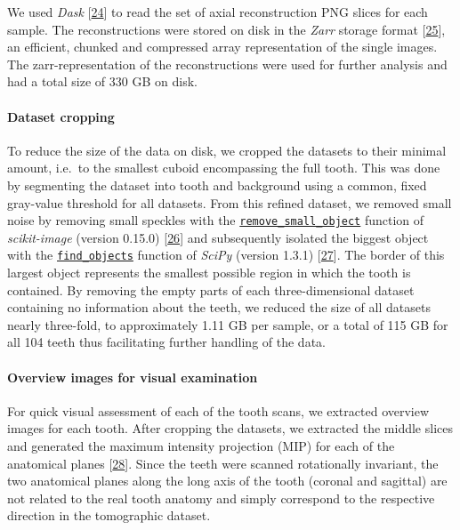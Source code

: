 \documentclass[
  american,
]{article}
\begin{document}
We used \emph{Dask} {[}\protect\hyperlink{ref-hj1CnyWB}{24}{]} to read the set of axial reconstruction PNG slices for each sample.
The reconstructions were stored on disk in the \emph{Zarr} storage format {[}\protect\hyperlink{ref-10Fk3ASPz}{25}{]}, an efficient, chunked and compressed array representation of the single images.
The zarr-representation of the reconstructions were used for further analysis and had a total size of 330 GB on disk.

\hypertarget{dataset-cropping}{%
\paragraph{Dataset cropping}\label{dataset-cropping}}

To reduce the size of the data on disk, we cropped the datasets to their minimal amount, i.e.~to the smallest cuboid encompassing the full tooth.
This was done by segmenting the dataset into tooth and background using a common, fixed gray-value threshold for all datasets.
From this refined dataset, we removed small noise by removing small speckles with the \href{https://scikit-image.org/docs/dev/api/skimage.morphology.html\#skimage.morphology.remove_small_objects}{\texttt{remove\_small\_object}} function of \emph{scikit-image} (version 0.15.0) {[}\protect\hyperlink{ref-stvWEJeu}{26}{]} and subsequently isolated the biggest object with the \href{https://docs.scipy.org/doc/scipy/reference/generated/scipy.ndimage.find_objects.html}{\texttt{find\_objects}} function of \emph{SciPy} (version 1.3.1) {[}\protect\hyperlink{ref-8Miti2Gz}{27}{]}.
The border of this largest object represents the smallest possible region in which the tooth is contained.
By removing the empty parts of each three-dimensional dataset containing no information about the teeth, we reduced the size of all datasets nearly three-fold, to approximately 1.11 GB per sample, or a total of 115 GB for all 104 teeth thus facilitating further handling of the data.

\hypertarget{overview-images-for-visual-examination}{%
\paragraph{Overview images for visual examination}\label{overview-images-for-visual-examination}}

For quick visual assessment of each of the tooth scans, we extracted overview images for each tooth.
After cropping the datasets, we extracted the middle slices and generated the maximum intensity projection (MIP) for each of the anatomical planes {[}\protect\hyperlink{ref-ydSnvH5h}{28}{]}.
Since the teeth were scanned rotationally invariant, the two anatomical planes along the long axis of the tooth (coronal and sagittal) are not related to the real tooth anatomy and simply correspond to the respective direction in the tomographic dataset.
\end{document}
